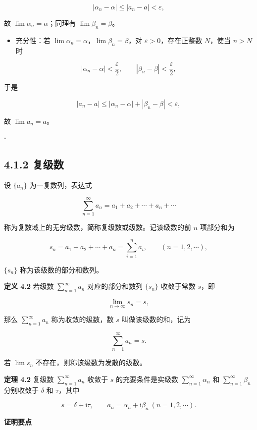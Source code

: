 \[
|\alpha_n-\alpha|\le|a_n-a|<\varepsilon,
\]

故 \(\lim\alpha_n=\alpha\)；同理有 \(\lim\beta_n=\beta\)。

\begin{itemize}
\tightlist
\item
  充分性：若 \(\lim\alpha_n=\alpha\)，\(\lim\beta_n=\beta\)，对
  \(\varepsilon>0\)，存在正整数 \(N\)，使当 \(n>N\) 时
\end{itemize}

\[
|\alpha_n-\alpha|<\frac{\varepsilon}{2},\qquad |\beta_n-\beta|<\frac{\varepsilon}{2},
\]

于是

\[
|a_n-a|\le|\alpha_n-\alpha|+|\beta_n-\beta|<\varepsilon,
\]

故 \(\lim a_n=a\)。

\(\square\)

\subsection{4.1.2 复级数}\label{ux590dux7ea7ux6570}

设 \(\{a_n\}\) 为一复数列，表达式

\[
\sum_{n=1}^{\infty}a_n=a_1+a_2+\cdots+a_n+\cdots
\]

称为复数域上的无穷级数，简称复级数或级数。记该级数的前 \(n\) 项部分和为

\[
s_n=a_1+a_2+\cdots+a_n=\sum_{i=1}^{n}a_i,\qquad (n=1,2,\cdots),
\]

\(\{s_n\}\) 称为该级数的部分和数列。

\textbf{定义 4.2} 若级数 \(\displaystyle\sum_{n=1}^{\infty}a_n\)
对应的部分和数列 \(\{s_n\}\) 收敛于常数 \(s\)，即

\[
\lim_{n\to\infty}s_n=s,
\]

那么 \(\displaystyle\sum_{n=1}^{\infty}a_n\) 称为收敛的级数，数 \(s\)
叫做该级数的和，记为

\[
\sum_{n=1}^{\infty}a_n=s.
\]

若 \(\lim s_n\) 不存在，则称该级数为发散的级数。

\textbf{定理 4.2} 复级数 \(\displaystyle\sum_{n=1}^{\infty}a_n\) 收敛于
\(s\) 的充要条件是实级数 \(\displaystyle\sum_{n=1}^{\infty}\alpha_n\) 和
\(\displaystyle\sum_{n=1}^{\infty}\beta_n\) 分别收敛于 \(\delta\) 和
\(\tau\)，其中

\[
s=\delta+\mathrm{i}\tau,\qquad a_n=\alpha_n+\mathrm{i}\beta_n\ (n=1,2,\cdots).
\]

\textbf{证明要点}

